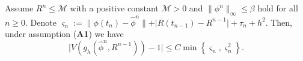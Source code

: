 \documentclass{m2an}
\begin{document}

\begin{lmm}\label{lem:estig} 
	Assume $ R^{n} \leq \mathcal{M} $ with a positive constant $ \mathcal{M} > 0 $ and $ \| \phi^{n} \|_{\infty} \leq \beta $ hold for all $ n \geq 0 $. Denote $ \varsigma_n := \| \phi(t_{n}) - \hat{\phi}^{n} \| + \vert R( t_{n-1} ) - R^{n-1} \vert + \tau_{n} + h^2 $. Then, under assumption (\textbf{A1}) we have
	\begin{equation*}
		\big\vert V( g_h( \hat{\phi}^n, R^{n-1} ) ) - 1 \big\vert \leq C \min \left\{ \varsigma_n,  \varsigma_n ^2  \right\}.
	\end{equation*}
\end{lmm}
\end{document}
